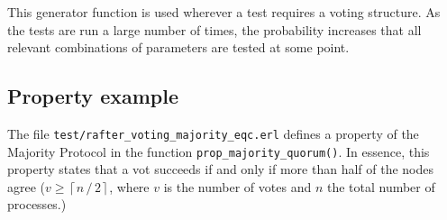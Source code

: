 \documentclass[11pt,chapterprefix=true,toc=bibliography,numbers=noendperiod,
               footnotes=multiple,twoside]{scrreprt}
\begin{document}
This generator function is used wherever a test requires a voting structure. As the tests are run a large number of times, the probability increases that all relevant combinations of parameters are tested at some point.

\subsection{Property example\label{ssc:property}}

The file \texttt{test/rafter\_voting\_majority\_eqc.erl} defines a property of the Majority Protocol in the function \texttt{prop\_majority\_quorum()}. In essence, this property states that a vot succeeds if and only if more than half of the nodes agree (\(v \ge \left\lceil n \, / \, 2 \right\rceil \), where \(v\) is the number of votes and \(n\) the total number of processes.)


%
%

\end{document}
